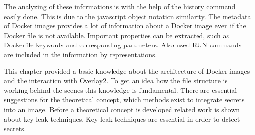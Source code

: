The analyzing of these informations is with the help of the history command easily done.
This is due to the javascript object notation similarity.
The metadata of Docker images provides a lot of information about a Docker image even if the Docker file is not available. Important properties can be extracted, such as Dockerfile keywords and corresponding parameters.
Also used RUN commands are included in the information by representations.

This chapter provided a basic knowledge about the architecture of Docker images and the interaction with Overlay2. To get an idea how the file structure is working behind the scenes this knowledge is fundamental. There are essential suggestions for the theoretical concept, which methods exist to integrate secrets into an image.
Before a theoretical concept is developed related work is shown about key leak techniques. Key leak techniques are essential in order to detect secrets.